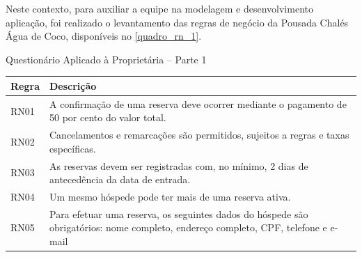 \documentclass[
	12pt,				%
	openany,			%
	oneside,			%
	a4paper,			%
	english,			%
	french,				%
	spanish,			%
	brazil				%
	]{abntex2}
\begin{document}
Neste contexto, para auxiliar a equipe na modelagem e desenvolvimento aplicação, foi realizado o levantamento das regras de negócio da Pousada Chalés Água de Coco, disponíveis no \autoref{quadro_rn_1}. 
  \\
%
\begin{quadro}[H]
	\caption{Questionário Aplicado à Proprietária – Parte 1}
	\label{quadro_rn_1}
	\begin{tabular}{|>{\centering\arraybackslash}p{3cm}|p{11cm}|}
		\hline
		\textbf{Regra} & \textbf{Descrição}  \\ \hline	
		RN01 & A confirmação de uma reserva deve ocorrer mediante o pagamento de 50 por cento do valor total.   \\ \hline
		RN02 & Cancelamentos e remarcações são permitidos, sujeitos a regras e taxas específicas.   \\ \hline
		RN03 & As reservas devem ser registradas com, no mínimo, 2 dias de antecedência da data de entrada.  \\ \hline
		RN04 & Um mesmo hóspede pode ter mais de uma reserva ativa.   \\ \hline
		RN05 & Para efetuar uma reserva, os seguintes dados do hóspede são obrigatórios: nome completo, endereço completo, CPF, telefone e e-mail   \\ \hline
	\end{tabular}
\end{quadro}
%
\end{document}
